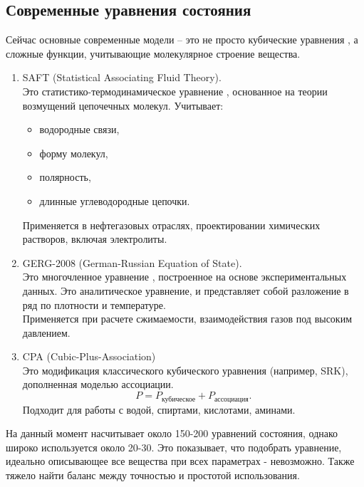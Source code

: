 \documentclass[a4paper]{article}
\numberwithin{equation}{subsection} %
\begin{document}
\subsection{Современные уравнения состояния}
Сейчас основные современные модели -- это не просто кубические уравнения , а сложные функции, учитывающие молекулярное строение вещества.
\begin{enumerate}
\item SAFT (Statistical Associating Fluid Theory).\\
 Это статистико-термодинамическое уравнение , основанное на теории возмущений цепочечных молекул. Учитывает:
\begin{itemize}
\item водородные связи,
\item форму молекул,
\item полярность,
\item длинные углеводородные цепочки.
\end{itemize}
Применяется в нефтегазовых отраслях, проектировании химических растворов, включая электролиты.

\item GERG-2008 (German-Russian Equation of State).\\
Это многочленное уравнение , построенное на основе экспериментальных данных. Это аналитическое уравнение, и представляет собой разложение в ряд по плотности и температуре.\\
Применяется при расчете сжимаемости, взаимодействия газов под высоким давлением.

\item CPA (Cubic-Plus-Association)\\
Это модификация классического кубического уравнения (например, SRK), дополненная моделью ассоциации.
\begin{equation*}
P = P_{\text{кубическое}} + P_{\text{ассоциация}}.
\end{equation*}
Подходит для работы с водой, спиртами, кислотами, аминами.
\end{enumerate}

На данный момент насчитывает около 150-200 уравнений состояния, однако широко используется около 20-30. Это показывает, что подобрать уравнение, идеально описывающее все вещества при всех параметрах - невозможно. Также тяжело найти баланс между точностью и простотой использования.
\end{document}
